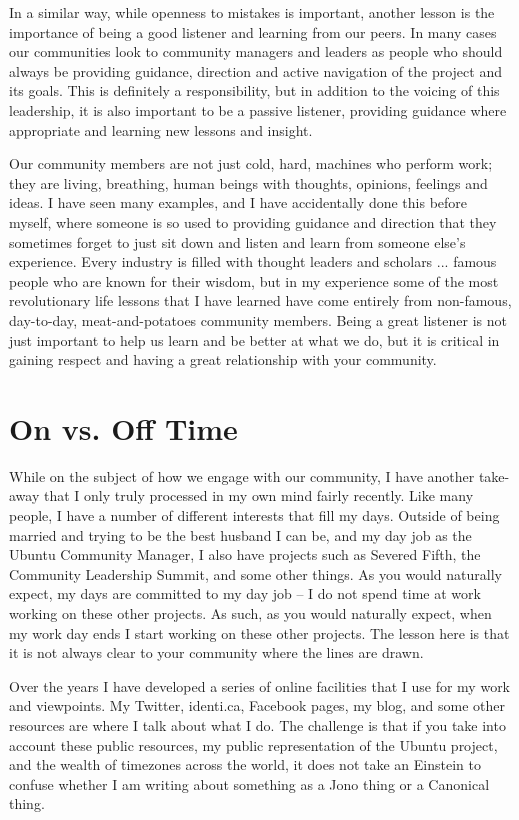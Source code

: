 In a similar way, while openness to mistakes is important, another lesson is the
importance of being a good listener and learning from our peers. In many cases
our communities look to community managers and leaders as people who should
always be providing guidance, direction and active navigation of the project and
its goals. This is definitely a responsibility, but in addition to the voicing
of this leadership, it is also important to be a passive listener, providing
guidance where appropriate and learning new lessons and insight.

Our community members are not just cold, hard, machines who perform work; they
are living, breathing, human beings with thoughts, opinions, feelings and ideas.
I have seen many examples, and I have accidentally done this before myself,
where someone is so used to providing guidance and direction that they sometimes
forget to just sit down and listen and learn from someone else’s experience.
Every industry is filled with thought leaders and scholars ... famous people
who are known for their wisdom, but in my experience some of the most
revolutionary life lessons that I have learned have come entirely from
non-famous, day-to-day, meat-and-potatoes community members. Being a great
listener is not just important to help us learn and be better at what we do, but
it is critical in gaining respect and having a great relationship with your
community.

\section*{On vs. Off Time}

While on the subject of how we engage with our community, I have another
take-away that I only truly processed in my own mind fairly recently. Like many
people, I have a number of different interests that fill my days. Outside of
being married and trying to be the best husband I can be, and my day job as the
Ubuntu Community Manager, I also have projects such as Severed Fifth, the
Community Leadership Summit, and some other things. As you would naturally
expect, my days are committed to my day job -- I do not spend time at work
working on these other projects. As such, as you would naturally expect, when my
work day ends I start working on these other projects. The lesson here is that
it is not always clear to your community where the lines are drawn.

Over the years I have developed a series of online facilities that I use for my
work and viewpoints. My Twitter, identi.ca, Facebook pages, my blog, and some
other resources are where I talk about what I do. The challenge is that if you
take into account these public resources, my public representation of the Ubuntu
project, and the wealth of timezones across the world, it does not take an
Einstein to confuse whether I am writing about something as a Jono thing or a
Canonical thing.

